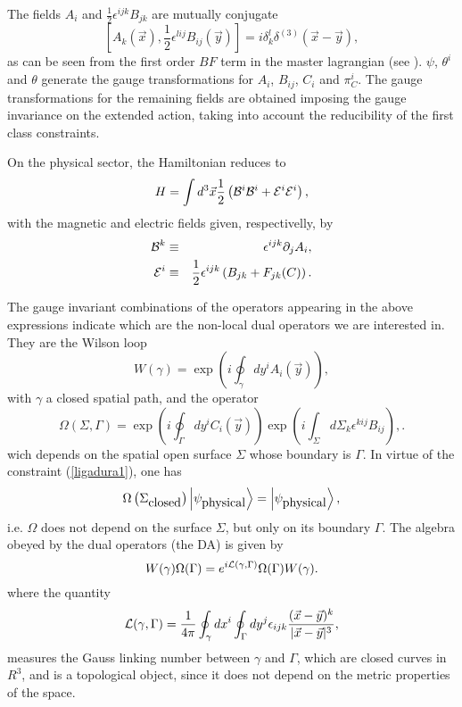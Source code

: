 \documentclass[a4paper,12pt]{article}
\newcommand{\ket}[1]{\left|#1\right\rangle}
\newcommand{\eref}[1]{(\ref{#1})}
\renewcommand{\sup}[1]{^{(#1)}}
\newcommand{\dtxy}{\delta\sup 3(\vec x-\vec y)}
\begin{document}
The fields $A_i$ and $\frac 12\epsilon^{ijk}B_{jk}$ are mutually conjugate
\begin{equation}
\left[A_k(\vec x),\frac 12\epsilon^{lij}B_{ij}(\vec y)\right]=i\delta_k^l\dtxy,
\end{equation}
as can be seen from the first order $BF$ term in the master lagrangian
(see \cite{Faddeev-Jackiw}). $\psi$, $\theta^i$ and $\theta$ generate
the gauge transformations for $A_i$, $B_{ij}$, $C_i$ and $\pi_C^i$.
The gauge transformations for the remaining fields are obtained imposing
the gauge invariance on the extended action, taking into account the
reducibility of the first class constraints.

On the physical sector, the Hamiltonian reduces to
\begin{equation}
H=\int d^3\vec x\frac 12\left({\cal B}^i{\cal B}^i+{\cal E}^i{\cal E}^i\right),
\end{equation}
with the magnetic and electric fields given, respectivelly, by
\begin{eqnarray}
{\cal B}^k&\equiv&\epsilon^{ijk}\partial_j A_i,\\
{\cal E}^i&\equiv&\frac 12\epsilon^{ijk}\left(B_{jk}+F_{jk}(C)\right).
\end{eqnarray}

The gauge invariant combinations of the operators appearing in the above
expressions indicate which are the non-local dual operators we are interested
in. They are the Wilson loop
\begin{equation}
W(\gamma)=\exp\left(i\oint_\gamma dy^iA_i(\vec y)\right),\label{WL-Maxwell}
\end{equation}
with $\gamma$ a closed spatial path, and the operator
\begin{equation}
\Omega(\Sigma,\Gamma)=\exp{\left(i\oint_\Gamma dy^iC_i(\vec y)\right)}
\exp{\left(i\int_\Sigma d\Sigma_k\epsilon^{kij}B_{ij}\right)},
\label{WD-Maxwell}.
\end{equation}
wich depends on the spatial open surface $\Sigma$ whose boundary is
$\Gamma$. In virtue of the constraint \eref{ligadura1}, one has
\begin{equation}
\Omega\left(\Sigma_{\hbox{closed}}\right)\ket{\psi_{\hbox{physical}}}=
\ket{\psi_{\hbox{physical}}},
\end{equation}
i.e. $\Omega$ does not depend on the surface $\Sigma$, but only on its
boundary $\Gamma$. The algebra obeyed by the dual operators (the DA) is
given by
\begin{equation}
W(\gamma)\Omega(\Gamma)=e^{i{\cal L}(\gamma,\Gamma)}
\Omega(\Gamma)W(\gamma).\label{AlgDual}
\end{equation}
where the quantity
\begin{equation}
{\cal L}(\gamma,\Gamma)=\frac 1{4\pi}\oint_\gamma dx^i\oint_\Gamma
dy^j\epsilon_{ijk}\frac{(\vec x-\vec y)^k}{|\vec x-\vec y|^3},
\end{equation}
measures the Gauss linking number between $\gamma$ and $\Gamma$,
which are closed curves in $R^3$, and is a topological object, since
it does not depend on the metric properties of the space.
\end{document}

